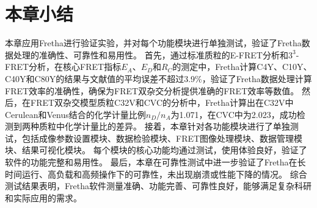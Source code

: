 \section{本章小结}
本章应用Fretha进行验证实验，并对每个功能模块进行单独测试，验证了Fretha数据处理的准确性、可靠性和易用性。
首先，通过标准质粒的E-FRET分析和$3^3$-FRET分析，在核心FRET指标$E_A$、$E_D$和$R_C$的测定中，Fretha计算C4Y、C10Y、C40Y和C80Y的结果与文献值的平均误差不超过3.9\%，验证了Fretha数据处理计算FRET效率的准确性，确保为FRET双杂交分析提供准确的FRET效率等数值。
然后，在FRET双杂交模型质粒C32V和CVC的分析中，Fretha计算出在C32V中Cerulean和Venus结合的化学计量比例$n_D/n_A$为1.071，在CVC中为2.023，成功检测到两种质粒中化学计量比的差异。
接着，本章针对各功能模块进行了单独测试，包括成像参数设置模块、数据检验模块、FRET图像处理模块、数据管理模块、结果可视化模块。
每个模块的核心功能均通过测试，使用体验良好，验证了软件的功能完整和易用性。
最后，本章在可靠性测试中进一步验证了Fretha在长时间运行、高负载和高频操作下的可靠性，未出现崩溃或性能下降的情况。
综合测试结果表明，Fretha软件测量准确、功能完善、可靠性良好，能够满足复杂科研和实际应用的需求。